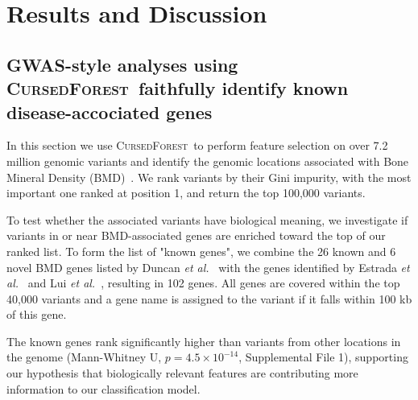 \documentclass[10pt,letterpaper]{article}
\newcommand{\cursedforest}{\textsc{CursedForest}\xspace}
\begin{document}
%
%
\section{Results and Discussion}


\subsection{GWAS-style analyses using \cursedforest\ faithfully identify known disease-accociated genes}
In this section we use \cursedforest\ to perform feature selection on over 7.2 million genomic variants and identify the
genomic locations associated with Bone Mineral Density (BMD)~\cite{Duncan.2011}. 
We rank variants by their Gini impurity, with the most important one ranked at position 1, and return the top 100,000 variants.

To test whether the associated variants have biological meaning, we investigate if variants in or near
BMD-associated genes are enriched toward the top of our ranked list. To form the list of "known genes", we
combine the 26 known and 6 novel BMD genes listed by Duncan {\it et al.}~\cite{Duncan.2011} with the genes identified by
Estrada {\it et al.}~\cite{Estrada2012} and Lui {\it et al.}~\cite{Liu2008}, resulting in 102 genes.  All genes are covered within the
top 40,000 variants and a gene name is assigned to the variant if it falls within 100 kb of this gene.

The known genes rank significantly higher than variants from other locations in the genome (Mann-Whitney U, $p=4.5\times10^{-14}$, Supplemental File 1), 
supporting our hypothesis that biologically relevant features are contributing more information to our classification model.
\end{document}
